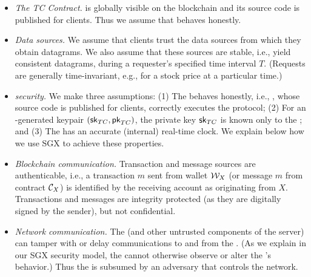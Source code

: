 \begin{itemize}
  \setlength{\itemsep}{2pt}
  \setlength{\parskip}{0pt}
  \setlength{\parsep}{0pt}

\item {\em The TC Contract.} \tcont is globally visible on the blockchain and its source code is published for clients. Thus we assume that \tcont behaves honestly.

\item {\em Data sources.} We assume that clients trust the data sources from which they obtain \tc datagrams. We also assume that these sources are stable, i.e., yield consistent datagrams, during a requester's specified time interval $T$. (Requests are generally time-invariant, e.g., for a stock price at a particular time.)

\item {\em \encname security.} We make three assumptions: (1) The \encname behaves honestly, i.e., \engine, whose source code is published for clients, correctly executes the protocol; (2) For an \encname-generated keypair $({\sf sk}_{TC}, {\sf pk}_{TC})$, the private key ${\sf sk}_{TC}$ is known only to the \encname; and (3) The \encname has an accurate (internal) real-time clock. We explain below how we use SGX to achieve these properties. 


\item {\em Blockchain communication.} Transaction and message sources are authenticable, i.e., a transaction $m$ sent from wallet ${\cal W}_{X}$ (or message $m$ from contract ${\cal C}_{X}$) is identified by the receiving account as originating from $X$. Transactions and messages are integrity protected (as they are digitally signed by the sender), but not confidential. 

\item {\em Network communication.} The \medname (and other untrusted components of the \tc server) can tamper with or delay communications to and from the \encname. (As we explain in our SGX security model, the \medname cannot otherwise observe or alter the \encname's behavior.) Thus the \medname is subsumed by an adversary that controls the network. 

\end{itemize}












